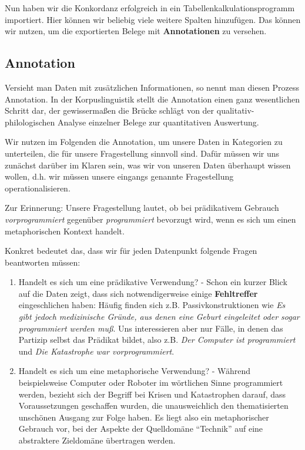 \documentclass[]{article}
\begin{document}
Nun haben wir die Konkordanz erfolgreich in ein
Tabellenkalkulationsprogramm importiert. Hier können wir beliebig viele
weitere Spalten hinzufügen. Das können wir nutzen, um die exportierten
Belege mit \textbf{Annotationen} zu versehen.

\subsection{Annotation}\label{annotation}

Versieht man Daten mit zusätzlichen Informationen, so nennt man diesen
Prozess Annotation. In der Korpuslinguistik stellt die Annotation einen
ganz wesentlichen Schritt dar, der gewissermaßen die Brücke schlägt von
der qualitativ-philologischen Analyse einzelner Belege zur quantitativen
Auswertung.

Wir nutzen im Folgenden die Annotation, um unsere Daten in Kategorien zu
unterteilen, die für unsere Fragestellung sinnvoll sind. Dafür müssen
wir uns zunächst darüber im Klaren sein, was wir von unseren Daten
überhaupt wissen wollen, d.h. wir müssen unsere eingangs genannte
Fragestellung operationalisieren.

Zur Erinnerung: Unsere Fragestellung lautet, ob bei prädikativem
Gebrauch \emph{vorprogrammiert} gegenüber \emph{programmiert} bevorzugt
wird, wenn es sich um einen metaphorischen Kontext handelt.

Konkret bedeutet das, dass wir für jeden Datenpunkt folgende Fragen
beantworten müssen:

\begin{enumerate}
\def\labelenumi{\arabic{enumi}.}
\item
  Handelt es sich um eine prädikative Verwendung? - Schon ein kurzer
  Blick auf die Daten zeigt, dass sich notwendigerweise einige
  \textbf{Fehltreffer} eingeschlichen haben: Häufig finden sich z.B.
  Passivkonstruktionen wie \emph{Es gibt jedoch medizinische Gründe, aus
  denen eine Geburt eingeleitet oder sogar programmiert werden muß}. Uns
  interessieren aber nur Fälle, in denen das Partizip selbst das
  Prädikat bildet, also z.B. \emph{Der Computer ist programmiert} und
  \emph{Die Katastrophe war vorprogrammiert}.
\item
  Handelt es sich um eine metaphorische Verwendung? - Während
  beispielsweise Computer oder Roboter im wörtlichen Sinne programmiert
  werden, bezieht sich der Begriff bei Krisen und Katastrophen darauf,
  dass Voraussetzungen geschaffen wurden, die unausweichlich den
  thematisierten unschönen Ausgang zur Folge haben. Es liegt also ein
  metaphorischer Gebrauch vor, bei der Aspekte der Quelldomäne
  ``Technik'' auf eine abstraktere Zieldomäne übertragen werden.
\end{enumerate}
\end{document}
